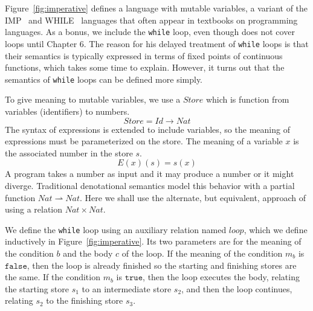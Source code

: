 \documentclass{tufte-handout}
\newcommand{\TRUE}[0]{\mathtt{true}}
\newcommand{\FALSE}[0]{\mathtt{false}}
\begin{document}

Figure~\ref{fig:imperative} defines a language with mutable variables,
a variant of the
IMP~\citep{Plotkin:1983aa,Winskel:1993uq,Amadio:1998fk} and
WHILE~\citep{Hoare:1969kw} languages that often appear in textbooks on
programming languages. As a bonus, we include the \texttt{while} loop,
even though \citet{Schmidt:1986vn} does not cover loops until Chapter
6. The reason for his delayed treatment of \texttt{while} loops is
that their semantics is typically expressed in terms of fixed points
of continuous functions, which takes some time to explain. However, it
turns out that the semantics of \texttt{while} loops can be defined
more simply.

To give meaning to mutable variables, we use a $\mathit{Store}$ which
is function from variables (identifiers) to numbers.
\[
  \mathit{Store} = \mathit{Id} \to \mathit{Nat}
\]
The syntax of expressions is extended to include variables, so the
meaning of expressions must be parameterized on the store. The meaning
of a variable $x$ is the associated number in the store $s$.
\[
  E(x)(s) = s(x)
\]
%
A program takes a number as input and it may produce a number or it
might diverge. Traditional denotational semantics model this behavior
with a partial function
$\mathit{Nat}\rightharpoonup\mathit{Nat}$. Here we shall use the
alternate, but equivalent, approach of using a relation
$\mathit{Nat}\times\mathit{Nat}$.

We define the \texttt{while} loop using an auxiliary relation named
$\mathit{loop}$, which we define inductively in
Figure~\ref{fig:imperative}. Its two parameters are for the meaning of
the condition $b$ and the body $c$ of the loop.  If the meaning of the
condition $m_b$ is $\FALSE$, then the loop is already finished so the
starting and finishing stores are the same. If the condition $m_b$ is
$\TRUE$, then the loop executes the body, relating the starting store
$s_1$ to an intermediate store $s_2$, and then the loop continues,
relating $s_2$ to the finishing store $s_3$.

\end{document}
